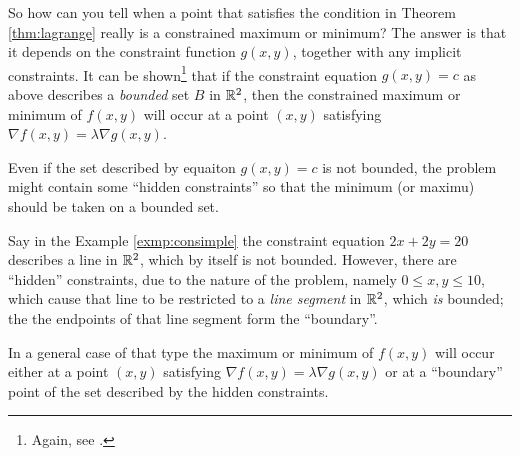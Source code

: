 So how can you tell when a point that satisfies the condition in Theorem \ref{thm:lagrange} really is a
constrained maximum or minimum? The answer is that it depends on the constraint function $g(x,y)$, together with any
implicit constraints. 
It can be shown\footnote{Again, see \cite{tm}.} that if the constraint equation $g(x,y)=c$  as above describes a \emph{bounded} set $B$ in $\mathbb{R}^{2}$, then the constrained maximum or minimum of
$f(x,y)$ will occur at a point $(x,y)$ satisfying $\nabla f(x,y) = \lambda \nabla g(x,y)$.

Even if the set described by equaiton $g(x,y)=c$ is not bounded, 
the problem might contain some ``hidden constraints'' so that the minimum (or maximu) should be taken on a bounded  set.

Say in the Example \ref{exmp:consimple} the constraint equation $2x+2y=20$ describes a line in $\mathbb{R}^{2}$, which by itself is
not bounded.
However, there are ``hidden'' constraints, due to the nature of the problem, namely $0\le x,y \le 10$,
which cause that line to be restricted to a \emph{line segment} in $\mathbb{R}^{2}$, which \emph{is} bounded;
the the endpoints of that line
segment form the ``boundary''.

In a general case of that type the maximum or minimum of
$f(x,y)$ will occur either at a point $(x,y)$ satisfying $\nabla f(x,y) = \lambda \nabla g(x,y)$  or at a ``boundary''
point of the set described by the hidden constraints.

